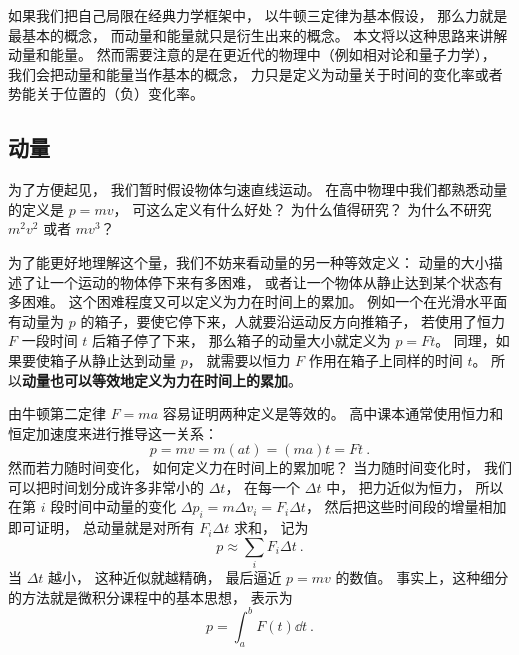 
\begin{issues}
\issueTODO
\end{issues}


如果我们把自己局限在经典力学框架中， 以牛顿三定律为基本假设， 那么力就是最基本的概念， 而动量和能量就只是衍生出来的概念。 本文将以这种思路来讲解动量和能量。 然而需要注意的是在更近代的物理中（例如相对论和量子力学）， 我们会把动量和能量当作基本的概念， 力只是定义为动量关于时间的变化率或者势能关于位置的（负）变化率。

\subsection{动量}\label{sub_CM1_1}
为了方便起见， 我们暂时假设物体匀速直线运动。 在高中物理中我们都熟悉动量的定义是 $p = mv$， 可这么定义有什么好处？ 为什么值得研究？ 为什么不研究 $m^2 v^2$ 或者 $mv^3$？

为了能更好地理解这个量，我们不妨来看动量的另一种等效定义： 动量的大小描述了让一个运动的物体停下来有多困难， 或者让一个物体从静止达到某个状态有多困难。 这个困难程度又可以定义为力在时间上的累加。 例如一个在光滑水平面有动量为 $p$ 的箱子，要使它停下来，人就要沿运动反方向推箱子， 若使用了恒力 $F$ 一段时间 $t$ 后箱子停了下来， 那么箱子的动量大小就定义为 $p = Ft$。 同理，如果要使箱子从静止达到动量 $p$， 就需要以恒力 $F$ 作用在箱子上同样的时间 $t$。 所以\textbf{动量也可以等效地定义为力在时间上的累加}。

由牛顿第二定律 $F = ma$ 容易证明两种定义是等效的。 高中课本通常使用恒力和恒定加速度来进行推导这一关系：
\begin{equation}
p = mv = m(at) = (ma)t = Ft~.
\end{equation}
然而若力随时间变化， 如何定义力在时间上的累加呢？ 当力随时间变化时， 我们可以把时间划分成许多非常小的 $\Delta t$， 在每一个 $\Delta t$ 中， 把力近似为恒力， 所以在第 $i$ 段时间中动量的变化 $\Delta p_i = m\Delta v_i = F_i\Delta t$， 然后把这些时间段的增量相加即可证明， 总动量就是对所有 $F_i\Delta t$ 求和， 记为
\begin{equation}
p \approx \sum_i F_i \Delta t~.
\end{equation}
当 $\Delta t$ 越小， 这种近似就越精确， 最后逼近 $p = mv$ 的数值。 事实上，这种细分的方法就是微积分课程中的基本思想， 表示为
\begin{equation}
p = \int_a^b F(t)\dd{t}~.
\end{equation}

